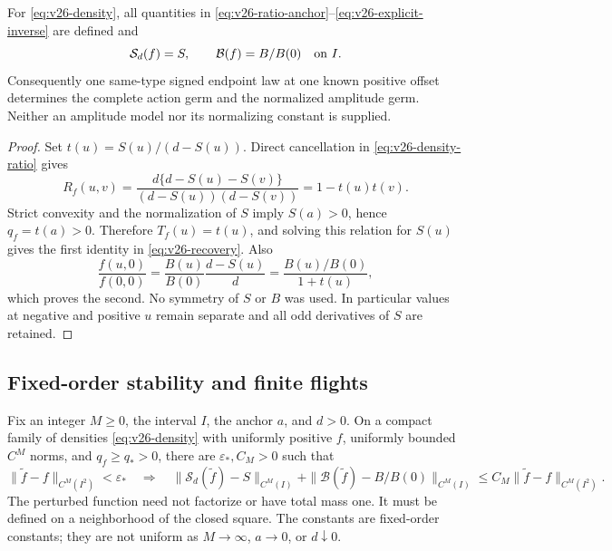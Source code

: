 \begin{theorem}\label{thm:v26-density-inverse}
For \eqref{eq:v26-density}, all quantities in
\eqref{eq:v26-ratio-anchor}--\eqref{eq:v26-explicit-inverse} are defined and
\begin{equation}\label{eq:v26-recovery}
              \mathcal S_d(f)=S,\qquad
              \mathcal B(f)=B/B(0)\quad\hbox{on }I.
\end{equation}
Consequently one same-type signed endpoint law at one known positive offset
determines the complete action germ and the normalized amplitude germ.
Neither an amplitude model nor its normalizing constant is supplied.
\end{theorem}

\begin{proof}
Set \(t(u)=S(u)/(d-S(u))\).  Direct cancellation in
\eqref{eq:v26-density-ratio} gives
\begin{equation}\label{eq:v26-rank-one-defect}
 R_f(u,v)=\frac{d\{d-S(u)-S(v)\}}{(d-S(u))(d-S(v))}
             =1-t(u)t(v).
\end{equation}
Strict convexity and the normalization of \(S\) imply \(S(a)>0\), hence
\(q_f=t(a)>0\).  Therefore \(T_f(u)=t(u)\), and solving this relation
for \(S(u)\) gives the first identity in \eqref{eq:v26-recovery}.  Also
\[
 \frac{f(u,0)}{f(0,0)}
       =\frac{B(u)}{B(0)}\frac{d-S(u)}d
       =\frac{B(u)/B(0)}{1+t(u)},
\]
which proves the second.  No symmetry of \(S\) or \(B\) was used.
In particular values at negative and positive \(u\) remain separate and
all odd derivatives of \(S\) are retained.
\end{proof}

\subsection{Fixed-order stability and finite flights}

\begin{proposition}
\label{prop:v26-density-stability}
Fix an integer \(M\ge0\), the interval \(I\), the anchor \(a\), and \(d>0\).
On a compact family of densities \eqref{eq:v26-density} with uniformly
positive \(f\), uniformly bounded \(C^M\) norms, and \(q_f\ge q_*>0\),
there are \(\varepsilon_*,C_M>0\) such that
\[
 \|\widetilde f-f\|_{C^M(I^2)}<\varepsilon_*
 \quad\Longrightarrow\quad
 \|\mathcal S_d(\widetilde f)-S\|_{C^M(I)}
 +\|\mathcal B(\widetilde f)-B/B(0)\|_{C^M(I)}
 \le C_M\|\widetilde f-f\|_{C^M(I^2)}.
\]
The perturbed function need not factorize or have total mass one.  It must
be defined on a neighborhood of the closed square.  The constants are
fixed-order constants; they are not uniform as \(M\to\infty\), \(a\to0\),
or \(d\downarrow0\).
\end{proposition}

